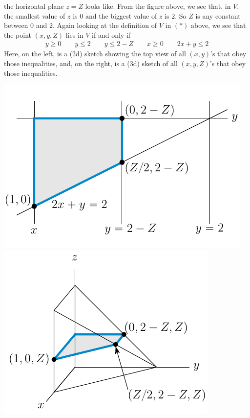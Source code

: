 \begin{eg}
the horizontal plane $z=Z$ looks like. From the figure above, we see that, in $V$, the smallest value of $z$ is $0$ and the biggest value of $z$ is $2$. 
So $Z$ is any constant between $0$ and $2$. Again looking at the definition of $V$ in $(*)$ above, we see that the point $(x,y,Z)$ lies in $V$ if and only if
\begin{align*}
y\ge 0\qquad y\le 2\qquad
y\le 2-Z\qquad
x\ge 0\qquad   
2x+y\le 2
\end{align*}
Here, on the left, is a (2d) sketch showing the top view of all $(x,y)$'s 
that obey those inequalities, and, on the right, is a (3d) sketch of all $(x,y,Z)$'s that obey those inequalities.
\begin{wfig}
\begin{center}
    \includegraphics{figures/integration/xchange3.pdf}\qquad
    \includegraphics{figures/integration/xchange6.pdf}
\end{center}

\end{wfig}
\end{eg}
